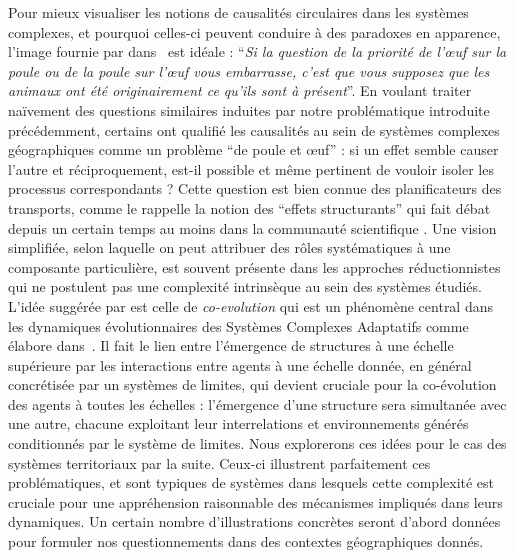 {Pour mieux visualiser les notions de causalités circulaires dans les systèmes complexes, et pourquoi celles-ci peuvent conduire à des paradoxes en apparence, l'image fournie par  dans~\cite{diderot1965entretien} est idéale : ``\textit{Si la question de la priorit{\'e} de l'\oe{}uf sur la poule ou de la poule sur l'\oe{}uf vous embarrasse, c'est que vous supposez que les animaux ont {\'e}t{\'e} originairement ce qu'ils sont {\`a} pr{\'e}sent}''. En voulant traiter naïvement des questions similaires induites par notre problématique introduite précédemment, certains ont qualifié les causalités au sein de systèmes complexes géographiques comme un problème ``de poule et {\oe}uf'' : si un effet semble causer l'autre et réciproquement, est-il possible et même pertinent de vouloir isoler les processus correspondants ? Cette question est bien connue des planificateurs des transports, comme le rappelle la notion des ``effets structurants'' qui fait débat depuis un certain temps au moins dans la communauté scientifique . Une vision simplifiée, selon laquelle on peut attribuer des rôles systématiques à une composante particulière, est souvent présente dans les approches réductionnistes qui ne postulent pas une complexité intrinsèque au sein des systèmes étudiés. L'idée suggérée par  est celle de \emph{co-evolution} qui est un phénomène central dans les dynamiques évolutionnaires des Systèmes Complexes Adaptatifs comme  élabore dans~\cite{holland2012signals}. Il fait le lien entre l'émergence de structures à une échelle supérieure par les interactions entre agents à une échelle donnée, en général concrétisée par un systèmes de limites, qui devient cruciale pour la co-évolution des agents à toutes les échelles : l'émergence d'une structure sera simultanée avec une autre, chacune exploitant leur interrelations et environnements générés conditionnés par le système de limites. Nous explorerons ces idées pour le cas des systèmes territoriaux par la suite. Ceux-ci illustrent parfaitement ces problématiques, et sont typiques de systèmes dans lesquels cette complexité est cruciale pour une appréhension raisonnable des mécanismes impliqués dans leurs dynamiques. Un certain nombre d'illustrations concrètes seront d'abord données pour formuler nos questionnements dans des contextes géographiques donnés.
}



